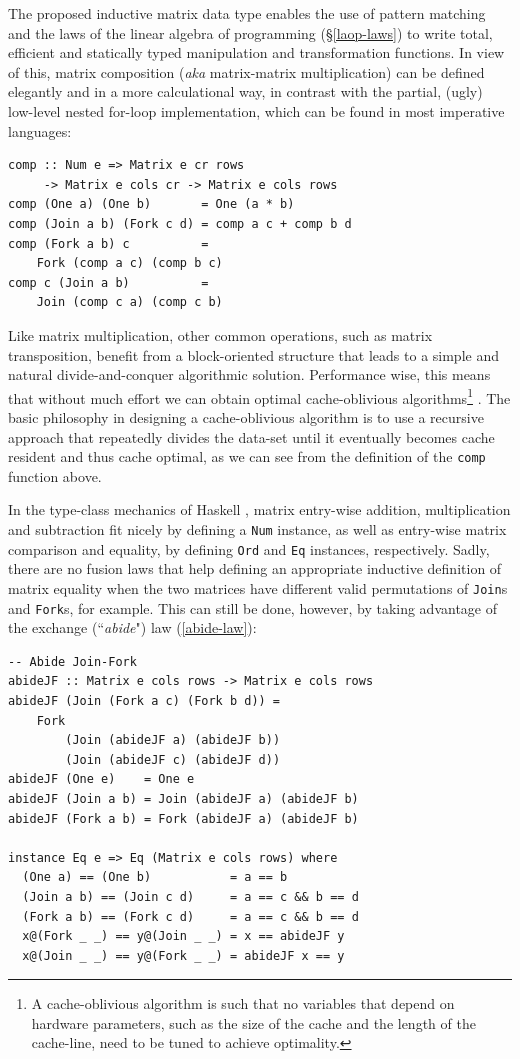 \documentclass[sigplan,screen]{acmart}\settopmatter{}
\newcommand{\hs}{\texttt}
\begin{document}
The proposed inductive matrix data type enables the use of pattern matching and the laws of the linear algebra of programming (\S\ref{laop-laws}) to write total, efficient and statically typed manipulation and transformation functions. In view of this, matrix composition (\emph{aka} matrix-matrix multiplication) can be defined elegantly and in a more calculational way, in contrast with the partial, (ugly) low-level nested for-loop implementation, which can be found in most imperative languages:
\begin{verbatim}
comp :: Num e => Matrix e cr rows 
     -> Matrix e cols cr -> Matrix e cols rows
comp (One a) (One b)       = One (a * b)
comp (Join a b) (Fork c d) = comp a c + comp b d
comp (Fork a b) c          = 
    Fork (comp a c) (comp b c)
comp c (Join a b)          = 
    Join (comp c a) (comp c b)
\end{verbatim}
Like matrix multiplication, other common operations, such as matrix transposition, benefit from a block-oriented structure that leads to a simple and natural divide-and-conquer algorithmic solution. Performance wise, this means that without much effort we can obtain optimal cache-oblivious algorithms\footnote{A cache-oblivious algorithm is such that no variables that depend on hardware parameters, such as the size of the cache and the length of the cache-line, need to be tuned to achieve optimality.} \citep{frigo1999cache}. The basic philosophy in designing a cache-oblivious algorithm is to use a recursive approach that repeatedly divides the data-set until it eventually becomes cache resident and thus cache optimal, as we can see from the definition of the \hs{comp} function above.

In the type-class mechanics of Haskell \cite{hall1996type}, matrix entry-wise addition, multiplication and subtraction fit nicely by defining a \hs{Num} instance, as well as entry-wise matrix comparison and equality, by defining \hs{Ord} and \hs{Eq} instances, respectively. Sadly, there are no fusion laws that help defining an appropriate inductive definition of matrix equality when the two matrices have different valid permutations of \hs{Join}s and \hs{Fork}s, for example. This can still be done, however, by taking advantage of the exchange (``\emph{abide}") law (\ref{abide-law}):

\vspace{1mm}
\begin{verbatim}
-- Abide Join-Fork
abideJF :: Matrix e cols rows -> Matrix e cols rows
abideJF (Join (Fork a c) (Fork b d)) = 
    Fork 
        (Join (abideJF a) (abideJF b)) 
        (Join (abideJF c) (abideJF d))
abideJF (One e)    = One e
abideJF (Join a b) = Join (abideJF a) (abideJF b)
abideJF (Fork a b) = Fork (abideJF a) (abideJF b)

instance Eq e => Eq (Matrix e cols rows) where
  (One a) == (One b)           = a == b
  (Join a b) == (Join c d)     = a == c && b == d
  (Fork a b) == (Fork c d)     = a == c && b == d
  x@(Fork _ _) == y@(Join _ _) = x == abideJF y
  x@(Join _ _) == y@(Fork _ _) = abideJF x == y
\end{verbatim}
\vspace{1mm}
\end{document}
